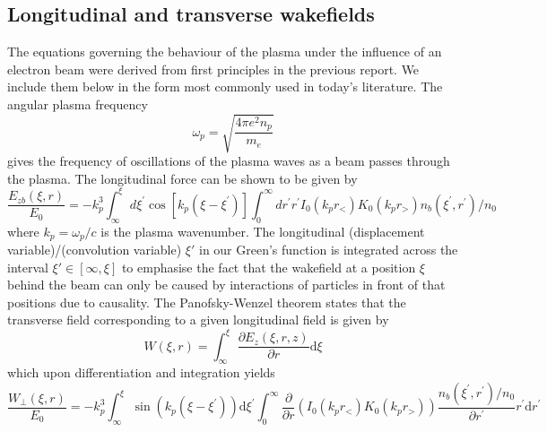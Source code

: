 \subsection{Longitudinal and transverse wakefields}
The equations governing the behaviour of the plasma under the influence of an electron beam were derived from first principles in the previous report. We include them below in the form most commonly used in today's literature. 
The angular plasma frequency
\begin{equation}
\label{PlasmaFrequency}
\omega_{p}=\sqrt{\frac{4 \pi e^{2} n_{p}}{m_{e}}}
\end{equation}
gives the frequency of oscillations of the plasma waves as a beam passes through the plasma. The longitudinal force can be shown to be given by 
\begin{equation}
\label{LongitduinalIntegral}
 \frac{E_{z b}(\xi, r)}{E_{0}}=-k_{p}^{3} \int_{\infty}^{\xi} d \xi^{\prime} \cos \left[k_{p}\left(\xi-\xi^{\prime}\right)\right]  \int_{0}^{\infty} d r^{\prime} r^{\prime} I_{0}\left(k_{p} r_{<}\right) K_{0}\left(k_{p} r_{>}\right) n_{b}\left(\xi^{\prime}, r^{\prime}\right) / n_{0} 
\end{equation}
where $k_p=\omega_p/c$ is the plasma wavenumber. The longitudinal (displacement variable)/(convolution variable) $\xi'$ in our Green's function is integrated across the interval $\xi'\in[\infty, \xi]$ to emphasise the fact that the wakefield at a position $\xi$ behind the beam can only be caused by interactions of particles in front of that positions due to causality.
The Panofsky-Wenzel theorem states that the transverse field corresponding to a given longitudinal field is given by
\begin{equation}
\label{Panofsky-Wenzel}
W\left(\xi,r\right)=\int^{\xi}_{\infty}\frac{\partial E_z\left(\xi,r,z\right)}{\partial r}\mathrm{d}\xi
\end{equation}
which upon differentiation and integration yields
\begin{equation}
\label{transverseIntegral}
\frac{W_{\perp}(\xi,r)}{E_{0}}=-k_{p}^{3} \int_{\infty}^{\xi} \sin \left(k_{p}\left(\xi-\xi^{\prime}\right)\right) \mathrm{d} \xi^{\prime} \int_{0}^{\infty} \frac{\partial}{\partial r}\left(I_{0}\left(k_{p} r_{<}\right) K_{0}\left(k_{p} r_{>}\right)\right) \frac{n_{b}\left(\xi^{\prime},r^{\prime}\right)/n_0}{\partial r^{\prime}} r^{\prime} \mathrm{d} r^{\prime}
\end{equation}
